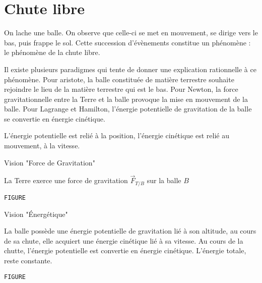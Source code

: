 
\section{Chute libre}
%

On lache une balle. On observe que celle-ci se met en mouvement, se dirige vers le bas, puis frappe le sol. Cette succession d'évènements constitue un phénomène : le phénomène de la chute libre.
\begin{center}

\end{center}


Il existe plusieurs paradigmes qui tente de donner une explication rationnelle à ce phénomène. Pour aristote, la balle constituée de matière terrestre souhaite rejoindre le lieu de la matière terrestre qui est le bas. Pour Newton, la force gravitationnelle entre la Terre et la balle provoque la mise en mouvement de la balle. Pour Lagrange et Hamilton, l'énergie potentielle de gravitation de la balle se convertie en énergie cinétique. 


L'énergie potentielle est relié à la position, l'énergie cinétique est relié au mouvement, à la vitesse.

\begin{center}
Vision "Force de Gravitation"
\end{center}
La Terre exerce une force de gravitation $\overrightarrow{F}_{T/B}$ sur la balle $B$
\begin{center}
%
\texttt{FIGURE}
\end{center}
\begin{center}
Vision "Énergétique"
\end{center}
La balle possède une énergie potentielle de gravitation lié à son altitude, au cours de sa chute, elle acquiert une énergie cinétique lié à sa vitesse. Au cours de la chutte, l'énergie potentielle est convertie en énergie cinétique. L'énergie totale, reste constante.
\begin{center}
%
\texttt{FIGURE}
\end{center}


